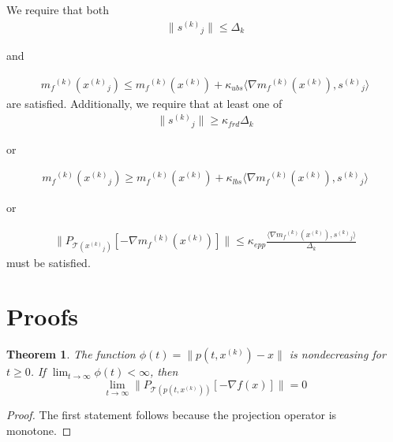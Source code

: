 \documentclass{article}
\newtheorem{theorem}{Theorem}[section]
\theoremstyle{case}
\newcommand{\modelk}{{{m}_f}^{(k)}}
\newcommand{\gradmodelk}{\nabla{{m}_f}^{(k)}}
\newcommand{\iteratek}{{x}^{(k)}}
\newcommand{\ptx}{p(t,\iteratek)}
\newcommand{\xj}{{{x}^{(k)}}_{j}}
\newcommand{\sj}{{{s}^{(k)}}_{j}}
\begin{document}
We require that both
\begin{align}
\label{too_big_1}
\|\sj\|\le \Delta_k
\end{align}
\begin{center}and\end{center}
\begin{align}
\label{too_big_2}
\modelk(\xj) \le \modelk(\iteratek) + \kappa_{ubs}\langle \gradmodelk(\iteratek), \sj\rangle
\end{align}
are satisfied.
Additionally, we require that at least one of
\begin{align}
\label{too_small_1}
\|\sj\| \ge \kappa_{frd}\Delta_k
\end{align}
\begin{center}or\end{center}
\begin{align}
\label{too_small_2}
\modelk(\xj) \ge \modelk(\iteratek) + \kappa_{lbs}\langle \nabla\modelk(\iteratek), \sj\rangle
\end{align}
\begin{center}or\end{center}
\begin{align}
\label{too_small_3}
\|P_{\mathcal T(\xj)}[-\gradmodelk(\iteratek)]\| \le \kappa_{epp} \frac{\langle \nabla\modelk(\iteratek), \sj \rangle}{\Delta_k}
\end{align}
must be satisfied.



\section{Proofs}

\begin{theorem}
\label{12_1_3}
The function $\phi(t) = \|\ptx-x\|$ is nondecreasing for $t\ge0$.
If $\lim_{t\to\infty}\phi(t) < \infty$, then
\[
\lim_{t\to\infty}\|P_{\mathcal T(\ptx)}[-\nabla f(x)]\| = 0
\]
\end{theorem}

\begin{proof}
The first statement follows because the projection operator is monotone.


\end{proof}
\end{document}
